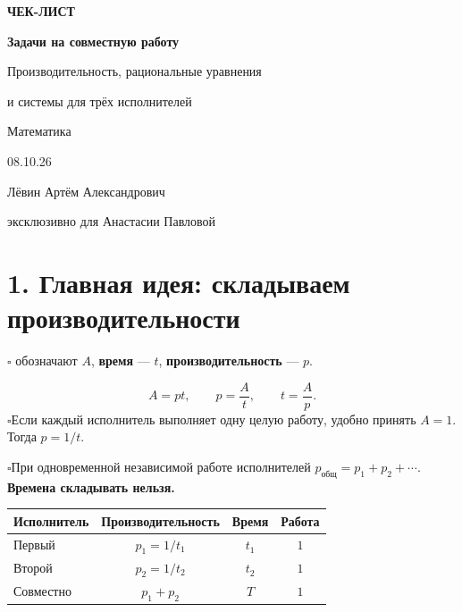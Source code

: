 \documentclass[a4paper,12pt]{article}
\newcommand{\checkitem}[1]{\noindent\(\square\)\enspace #1\par}
\newcommand{\keyterm}[1]{{\color{darkaccent}\textbf{#1}}}
\begin{document}
\begin{titlepage}
\thispagestyle{empty}
\begin{center}
\vspace*{43mm}
{\Large\color{accent}\bfseries ЧЕК-ЛИСТ\par}
\vspace{11mm}
{\Huge\color{darkaccent}\bfseries Задачи на совместную работу\par}
\vspace{6mm}
{\Large Производительность, рациональные уравнения\par}
{\Large и системы для трёх исполнителей\par}
\vspace{19mm}
{\large Математика\par}
\vspace{11mm}
{\large 08.10.26\par}
\vfill
{\normalsize Лёвин Артём Александрович\par}
{\normalsize эксклюзивно для Анастасии Павловой\par}
\vspace{19mm}
\end{center}
\end{titlepage}
\setcounter{page}{2}

\section*{1. Главная идея: складываем производительности}
\checkitem{\keyterm{Результат работы} обозначают \(A\), \keyterm{время} --- \(t\), \keyterm{производительность} --- \(p\).}
\[
\boxed{A=pt,\qquad p=\frac At,\qquad t=\frac Ap.}
\]
\checkitem{Если каждый исполнитель выполняет одну целую работу, удобно принять \(A=1\). Тогда \(p=1/t\).}
\checkitem{При одновременной независимой работе исполнителей \(p_{\text{общ}}=p_1+p_2+\cdots\). \keyterm{Времена складывать нельзя.}}

\begin{center}
\renewcommand{\arraystretch}{1.22}
\begin{tabularx}{.93\linewidth}{@{}Xccc@{}}
\toprule
\textbf{Исполнитель} & \textbf{Производительность} & \textbf{Время} & \textbf{Работа}\\
\midrule
Первый & \(p_1=1/t_1\) & \(t_1\) & \(1\)\\
Второй & \(p_2=1/t_2\) & \(t_2\) & \(1\)\\
Совместно & \(p_1+p_2\) & \(T\) & \(1\)\\
\bottomrule
\end{tabularx}
\end{center}
\end{document}
